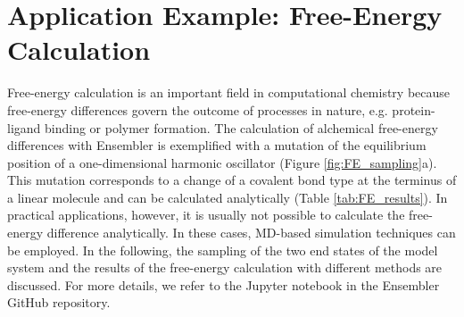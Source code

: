 \section{Application Example: Free-Energy Calculation}

Free-energy calculation is an important field in computational chemistry because free-energy differences govern the outcome of processes in nature, e.g. protein-ligand binding or polymer formation.\cite{Christ2009, Hansen2014, Cournia2020, Armacost2020} 
%
The calculation of alchemical free-energy differences with Ensembler is exemplified with a mutation of the equilibrium position of a one-dimensional harmonic oscillator (Figure \ref{fig:FE_sampling}a).
This mutation corresponds to a change of a covalent bond type at the terminus of a linear molecule and can be calculated analytically (Table \ref{tab:FE_results}).
In practical applications, however, it is usually not possible to calculate the free-energy difference analytically. In these cases, MD-based simulation techniques can be employed.
In the following, the sampling of the two end states of the model system and the results of the free-energy calculation with different methods are discussed. For more details, we refer to the Jupyter notebook in the Ensembler GitHub repository.

